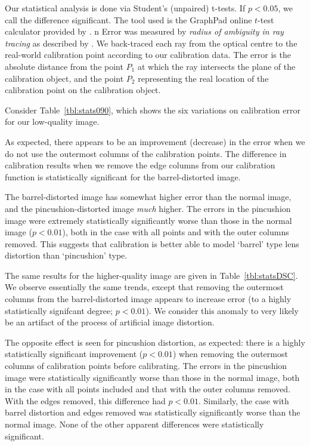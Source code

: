 Our statistical analysis is done via Student's (unpaired) t-tests. If $p < 0.05$, we call the difference significant. The tool used is the GraphPad online $t$-test calculator provided by \citet{testcalc}.
n
Error was measured by \emph{radius of ambiguity in ray tracing} as described by \citet{TSAI}. We back-traced each ray from the optical centre to the real-world calibration point according to our calibration data. The error is the absolute distance from the point $P_{1}$ at which the ray intersects the plane of the calibration object, and the point $P_{2}$ representing the real location of the calibration point on the calibration object.

Consider Table~\ref{tbl:stats090}, which shows the six variations on calibration error for our low-quality image.

As expected, there appears to be an improvement (decrease) in the error when we do not use the outermost columns of the calibration points. The difference in calibration results when we remove the edge columns from our calibration function is statistically significant for the barrel-distorted image.

The barrel-distorted image has somewhat higher error than the normal image, and the pincushion-distorted image \emph{much} higher. The errors in the pincushion image were extremely statistically significantly worse than those in the normal image ($p < 0.01$), both in the case with all points and with the outer columns removed. This suggests that calibration is better able to model `barrel' type lens distortion than `pincushion' type.

The same results for the higher-quality image are given in Table~\ref{tbl:statsDSC}. We observe essentially the same trends, except that removing the outermost columns from the barrel-distorted image appears to increase error (to a highly statistically signifcant degree; $p < 0.01$). We consider this anomaly to very likely be an artifact of the process of artificial image distortion.

The opposite effect is seen for pincushion distortion, as expected: there is a highly statistically significant improvement ($p < 0.01$) when removing the outermost columns of calibration points before calibrating. The errors in the pincushion image were statistically significantly worse than those in the normal image, both in the case with all points included and that with the outer columns removed. With the edges removed, this difference had $p < 0.01$. Similarly, the case with barrel distortion and edges removed was statistically significantly worse than the normal image. None of the other apparent differences were statistically significant.

